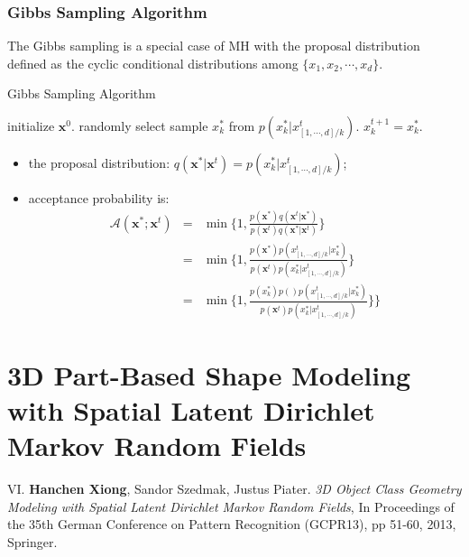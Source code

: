 \subsubsection{Gibbs Sampling Algorithm}
The Gibbs sampling is a special case of MH with the proposal distribution defined as the cyclic conditional distributions among $\{x_1,x_2,\cdots,x_d\}$.               
\begin{algorithm}[t]
	\caption{Gibbs Sampling Algorithm}
	\label{alg:LBP}
\begin{algorithmic}[1]
\STATE initialize $\mathbf{x}^0$.
\STATE randomly select   
\STATE sample $x^*_k$ from  $p(x_k^*|x_{[1,\cdots,d]/k}^t)$.
\STATE $x^{t+1}_k=x^*_k$.
\ENDFOR
\end{algorithmic}
\end{algorithm}


\begin{itemize}
	\item the proposal distribution: $q(\mathbf{x}^*|\mathbf{x}^t)=p(x_k^*|x_{[1,\cdots,d]/k}^t)$;
	\item acceptance probability is: 
		\begin{equation*}
			\begin{array}{rcl}
				\mathcal{A}(\mathbf{x}^*;\mathbf{x}^t) &=& \min\{1, \frac{p(\mathbf{x}^*)q(\mathbf{x}^t|\mathbf{x}^*)}{p(\mathbf{x}^t)q(\mathbf{x}^*|\mathbf{x}^t)}\} \\
																				  &=& \min\{1, \frac{p(\mathbf{x}^*)p(x_{[1,\cdots,d]/k}^t|x_k^*)}{p(\mathbf{x}^t)p(x_k^*|x_{[1,\cdots,d]/k}^t)}\} \\
															 &=& \min\{1,\frac{p(x_k^*)p()p(x_{[1,\cdots,d]/k}^t|x_k^*)}{p(\mathbf{x}^t)p(x_k^*|x_{[1,\cdots,d]/k}^t)}\} \}
        	\end{array}
	    \end{equation*}
\end{itemize}

\section{3D Part-Based Shape Modeling with Spatial Latent Dirichlet Markov Random Fields}
\label{sec:3D_Shape}
\begin{shaded}
{\Huge VI.} \textbf{Hanchen Xiong}, Sandor Szedmak, Justus Piater. {\it 3D Object Class Geometry Modeling with Spatial Latent Dirichlet Markov Random Fields}, In Proceedings of the 35th German Conference on Pattern Recognition (GCPR13), pp 51-60, 2013,  Springer.  
\vspace{-.2cm}

\end{shaded}

